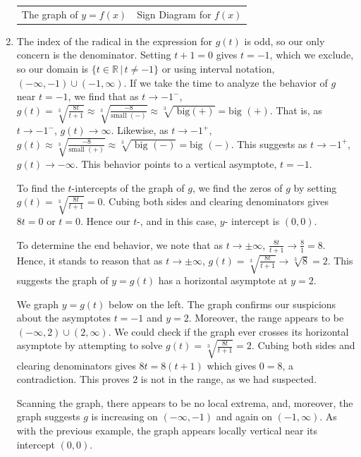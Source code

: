 \begin{ex}
\begin{enumerate}
\begin{center}
\begin{tabular}{cc}
The graph of $y=f(x)$  \hspace{0.75in} & Sign Diagram for $f(x)$ \\


\end{tabular}
\end{center} 


\item  The index of the radical  in the expression for $g(t)$ is odd, so our only concern is the denominator.  Setting $t+1=0$ gives $t=-1$, which we exclude, so our domain is $\{ t \in \mathbb{R} \, | \, t \neq -1\}$ or using interval notation, $(-\infty, -1) \cup (-1, \infty)$.    If we take the time to analyze the behavior of $g$ near $t=-1$, we find that as $t \rightarrow -1^{-}$, $g(t) = \sqrt[3]{\frac{8t}{t+1}}  \approx \sqrt[3]{\frac{-8}{\text{small $(-)$}}}  \approx \sqrt[3]{\text{ big$(+)$}} = \text{big $(+)$}$.  That is, as $t \rightarrow -1^{-}$, $g(t) \rightarrow \infty$.  Likewise, as $t \rightarrow -1^{+}$, $g(t)  \approx \sqrt[3]{\frac{-8}{\text{small $(+)$}}}  \approx \sqrt[3]{\text{ big $(-)$}} = \text{big $(-)$}$.  This suggests as $t \rightarrow -1^{+}$, $g(t) \rightarrow -\infty$.  This behavior points to a vertical asymptote, $t=-1$.

To find the $t$-intercepts of the graph of $g$, we find the zeros of $g$ by setting $g(t) = \sqrt[3]{\frac{8t}{t+1}} = 0$.  Cubing both sides and clearing denominators  gives $8t = 0$ or $t = 0$.  Hence our  $t$-, and in this case,  $y$- intercept is $(0,0)$.

To determine the end behavior, we note that as $t \rightarrow \pm \infty$, $\frac{8t}{t+1} \rightarrow \frac{8}{1} = 8$.  Hence, it stands to reason that as $t\rightarrow \pm \infty$, $g(t) =  \sqrt[3]{\frac{8t}{t+1}} \rightarrow \sqrt[3]{8} = 2$.  This suggests the graph of $y = g(t)$ has a horizontal asymptote at $y = 2$.

We graph $y = g(t)$ below on the left. The graph confirms our suspicions about the asymptotes $t = -1$ and $y = 2$.  Moreover, the range appears to be $(-\infty, 2) \cup (2, \infty)$.  We could check if the graph ever crosses its horizontal asymptote by attempting to solve $g(t) =  \sqrt[3]{\frac{8t}{t+1}} = 2$.  Cubing both sides and clearing denominators gives $8t = 8(t+1)$ which gives $0 = 8$, a contradiction.  This proves $2$ is not in the range, as we had suspected. 

Scanning the graph,  there  appears to be no local extrema, and, moreover,  the graph suggests $g$  is increasing on $(-\infty, -1)$ and again on $(-1, \infty)$.  As with the previous example, the graph appears locally vertical near its intercept $(0,0)$.


\end{enumerate}
\end{ex}

